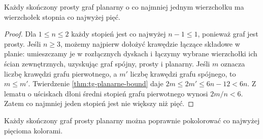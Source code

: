 \begin{lemat}
\label{lem:tg-planar-small-degree}
Każdy skończony prosty graf planarny o co najmniej jednym
wierzchołku ma wierzchołek stopnia co najwyżej pięć.
\end{lemat}

\begin{proof}
Dla $1\le n\le2$ każdy stopień jest co najwyżej
$n-1\le1$, ponieważ graf jest prosty. Jeśli $n\ge3$, możemy
najpierw dołożyć krawędzie łączące składowe w planie:
umieszczamy je w rozłącznych dyskach i łączymy
wybrane wierzchołki ich ścian zewnętrznych,
uzyskując graf spójny, prosty i planarny.
Jeśli $m$ oznacza liczbę krawędzi grafu pierwotnego,
a $m'$ liczbę krawędzi grafu spójnego, to $m\le m'$.
Twierdzenie \ref{thm:tg-planarne-bound} daje
$2m\le 2m'\le6n-12<6n$.
Z lematu o uściskach dłoni średni stopień grafu
pierwotnego wynosi $2m/n<6$.
Zatem co najmniej jeden stopień jest nie większy niż pięć.
\end{proof}

\begin{twierdzenie}
\label{thm:tg-5color}
Każdy skończony graf prosty planarny można poprawnie
pokolorować co najwyżej pięcioma kolorami.
\end{twierdzenie}

